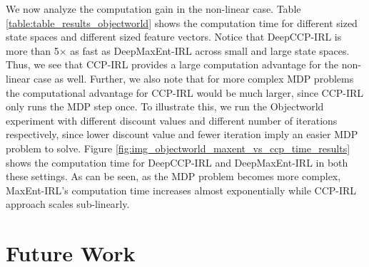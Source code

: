 \documentclass{article}
\begin{document}

We now analyze the computation gain in the non-linear case. Table \ref{table:table_results_objectworld} shows the computation time for different sized state spaces and different sized feature vectors. Notice that DeepCCP-IRL is more than 5$\times$ as fast as DeepMaxEnt-IRL across small and large state spaces. Thus, we see that CCP-IRL provides a large computation advantage for the non-linear case as well. Further, we also note that for more complex MDP problems the computational advantage for CCP-IRL would be much larger, since CCP-IRL only runs the MDP step once. To illustrate this, we run the Objectworld experiment with different discount values and different number of iterations respectively, since lower discount value and fewer iteration imply an easier MDP problem to solve. Figure \ref{fig:img_objectworld_maxent_vs_ccp_time_results} shows the computation time for DeepCCP-IRL and DeepMaxEnt-IRL in both these settings. As can be seen, as the MDP problem becomes more complex, MaxEnt-IRL's computation time increases almost exponentially while CCP-IRL approach scales sub-linearly.




\section{Future Work}

\end{document}
